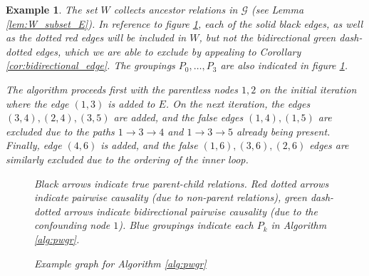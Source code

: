 \documentclass{statsoc}
\def\gcg{\mathcal{G}}  %
\newtheorem{example}{Example}
\begin{document}
\begin{example}
  The set $W$ collects ancestor relations in $\gcg$ (see Lemma
  \ref{lem:W_subset_E}).  In reference to figure
  \ref{fig:example_fig3}, each of the solid black edges, as well as
  the dotted red edges will be included in $W$, but \textit{not} the
  bidirectional green dash-dotted edges, which we are able to exclude
  by appealing to Corollary \ref{cor:bidirectional_edge}.  The
  groupings $P_0, \ldots, P_3$ are also indicated in figure
  \ref{fig:example_fig3}.

  The algorithm proceeds first with the parentless nodes $1, 2$ on the
  initial iteration where the edge $(1, 3)$ is added to $E$.  On the
  next iteration, the edges $(3, 4), (2, 4), (3, 5)$ are added, and
  the false edges $(1, 4), (1, 5)$ are excluded due to the paths
  $1 \rightarrow 3 \rightarrow 4$ and $1 \rightarrow 3 \rightarrow 5$
  already being present.  Finally, edge $(4, 6)$ is added, and the false
  $(1, 6), (3, 6), (2, 6)$ edges are similarly excluded due to the
  ordering of the inner loop.
  
  \begin{figure}
    \centering
    \caption{Example graph for Algorithm \ref{alg:pwgr}}
    {\footnotesize{Black arrows indicate true parent-child
        relations.  Red dotted arrows indicate pairwise causality (due to
        non-parent relations), green dash-dotted arrows indicate
        bidirectional pairwise causality (due to the confounding node
        $1$).  Blue groupings indicate each $P_k$ in Algorithm
        \ref{alg:pwgr}.}}
    \label{fig:example_fig3}
    

\end{figure}
\end{example}
\end{document}
